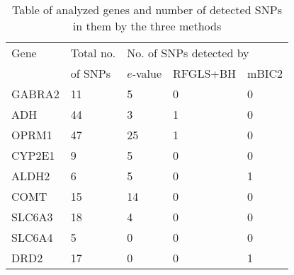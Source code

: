 \begin{table}[b]
\centering
\begin{scriptsize}
    \begin{tabular}{l|l|lll}
    \hline
    Gene   & Total no. & \multicolumn{3}{l}{No. of SNPs detected by }\\\cline{3-5}
    & of SNPs & $e$-value & RFGLS+BH & mBIC2 \\\hline
    GABRA2 & 11        & 5       & 0     & 0     \\
    ADH    & 44        & 3       & 1     & 0     \\
    OPRM1  & 47        & 25      & 1     & 0     \\
    CYP2E1 & 9         & 5       & 0     & 0     \\
    ALDH2  & 6         & 5       & 0     & 1     \\
    COMT   & 15        & 14      & 0     & 0     \\
    SLC6A3 & 18        & 4       & 0     & 0     \\
    SLC6A4 & 5         & 0       & 0     & 0     \\
    DRD2   & 17        & 0       & 0     & 1     \\\hline
    \end{tabular}
    \caption{Table of analyzed genes and number of detected SNPs in them by the three methods}
    \label{table:genetable}
\end{scriptsize}
\end{table}
%
